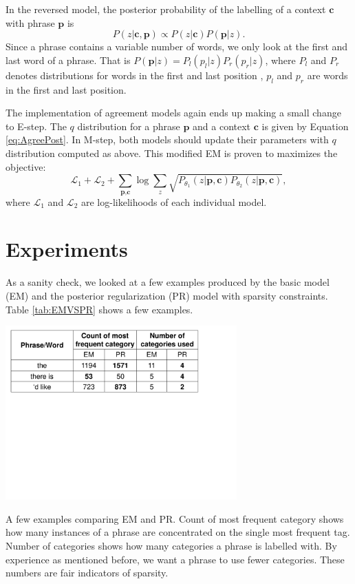 In the reversed model,
the posterior probability of the labelling of
a context $\textbf{c}$ with
phrase $\textbf{p}$ is 
\[
P(z|\textbf{c},\textbf{p})\propto 
P(z|\textbf{c})P(\textbf{p}|z).
\]
Since a phrase contains a variable number of words,
we only look at the first and last word of
a phrase. That is $P(\textbf{p}|z)=P_l(p_l|z)P_r(p_r|z)$,
where $P_l$ and $P_r$
denotes distributions for words in the first and last position
, $p_l$ and $p_r$ are words in the first and last position.

The implementation of agreement models again ends up making
a small change to E-step. The $q$ distribution for
a phrase $\textbf{p}$ and a context $\textbf{c}$ 
is given by Equation \ref{eq:AgreePost}.
In M-step, both models should update their parameters with $q$ distribution computed as above.
This modified EM is proven to
maximizes the objective:
\[
\mathcal{L}_1+
\mathcal{L}_2+
\sum_{\textbf{p},\textbf{c}}
\log\sum_z\sqrt{P_{\theta_1}(z|\textbf{p},\textbf{c})
P_{\theta_2}(z|\textbf{p},\textbf{c})},
\]
where $\mathcal{L}_1$ and $\mathcal{L}_2$
are log-likelihoods of
each individual model.
\section{Experiments}
As a sanity check, we looked at a few examples produced by
the basic model (EM) 
and the posterior regularization (PR) model
with sparsity constraints. Table \ref{tab:EMVSPR}
shows a few examples.

\begin{table}[h]
  \centering
  \includegraphics[width=3.5in]{pr-clustering/EMVSPR}
  \caption[A few examples comparing EM and PR]
  {A few examples comparing EM and PR. 
    Count of most frequent category shows how 
    many instances of a phrase are concentrated on 
    the single most frequent tag. 
    Number of categories shows how many categories
    a phrase is labelled with. By experience as mentioned before, 
    we want a phrase to use fewer categories. 
	These numbers are fair indicators of sparsity.
    }
  \label{tab:EMVSPR}
\end{table}

